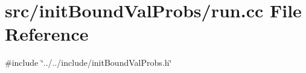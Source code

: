 \section{src/init\+Bound\+Val\+Probs/run.cc File Reference}
\label{run_8cc}
{\ttfamily \#include \char`\"{}../../include/init\+Bound\+Val\+Probs.\+h\char`\"{}}\newline
